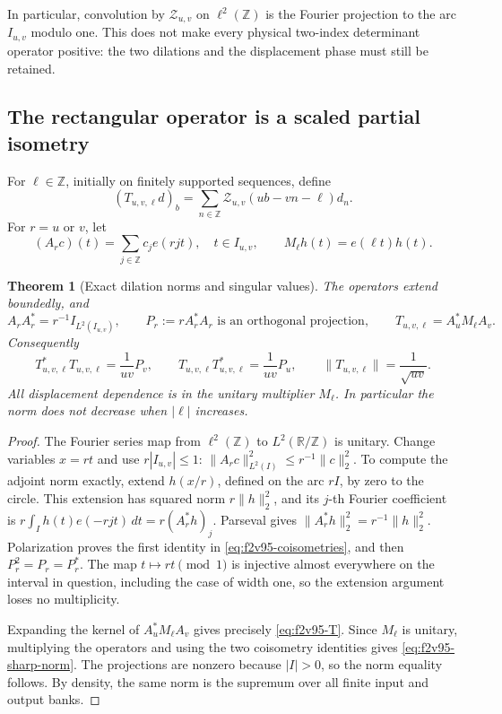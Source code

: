 \documentclass[11pt]{article}
\newtheorem{theorem}{Theorem}[section]
\theoremstyle{definition}
\theoremstyle{remark}
\begin{document}
In particular, convolution by \(\mathscr Z_{u,v}\) on
\(\ell^2(\mathbb Z)\) is the Fourier projection to the arc
\(I_{u,v}\) modulo one.  This does not make every physical
two-index determinant operator positive: the two dilations and the
displacement phase must still be retained.

\subsection{The rectangular operator is a scaled partial isometry}

For \(\ell\in\mathbb Z\), initially on finitely supported sequences,
define
\begin{equation}
 (T_{u,v,\ell}d)_b
 =\sum_{n\in\mathbb Z}\mathscr Z_{u,v}(ub-vn-\ell)d_n.
 \label{eq:f2v95-T}
\end{equation}
For \(r=u\) or \(v\), let
\[
 (A_rc)(t)=\sum_{j\in\mathbb Z}c_j e(rjt),\quad t\in I_{u,v},
 \qquad M_\ell h(t)=e(\ell t)h(t).
\]

\begin{theorem}[Exact dilation norms and singular values]
\label{thm:f2v95-partial-isometry}
The operators extend boundedly, and
\begin{equation}
 A_rA_r^*=r^{-1}I_{L^2(I_{u,v})},\qquad
 P_r:=rA_r^*A_r\text{ is an orthogonal projection},\qquad
 T_{u,v,\ell}=A_u^*M_\ell A_v.
 \label{eq:f2v95-coisometries}
\end{equation}
Consequently
\begin{equation}
 T_{u,v,\ell}^*T_{u,v,\ell}=\frac1{uv}P_v,\qquad
 T_{u,v,\ell}T_{u,v,\ell}^*=\frac1{uv}P_u,\qquad
 \|T_{u,v,\ell}\|=\frac1{\sqrt{uv}}.
 \label{eq:f2v95-sharp-norm}
\end{equation}
All displacement dependence is in the unitary multiplier \(M_\ell\).
In particular the norm does not decrease when \(|\ell|\) increases.
\end{theorem}

\begin{proof}
The Fourier series map from \(\ell^2(\mathbb Z)\) to
\(L^2(\mathbb R/\mathbb Z)\) is unitary.  Change variables
\(x=rt\) and use \(r|I_{u,v}|\le1\):
\(\|A_rc\|_{L^2(I)}^2\le r^{-1}\|c\|_2^2\).
To compute the adjoint norm exactly, extend \(h(x/r)\), defined
on the arc \(rI\), by zero to the circle.  This extension has squared
norm \(r\|h\|_2^2\), and its \(j\)-th Fourier coefficient is
\(r\int_I h(t)e(-rjt)\,dt=r(A_r^*h)_j\).
Parseval gives \(\|A_r^*h\|_2^2=r^{-1}\|h\|_2^2\).
Polarization proves the first identity in
\eqref{eq:f2v95-coisometries}, and then \(P_r^2=P_r=P_r^*\).
The map \(t\mapsto rt\pmod1\) is injective almost everywhere
on the interval in question, including the case of width one, so the
extension argument loses no multiplicity.

Expanding the kernel of \(A_u^*M_\ell A_v\) gives precisely
\eqref{eq:f2v95-T}.  Since \(M_\ell\) is unitary, multiplying
the operators and using the two coisometry identities gives
\eqref{eq:f2v95-sharp-norm}.  The projections are nonzero because
\(|I|>0\), so the norm equality follows.  By density, the same norm
is the supremum over all finite input and output banks.
\end{proof}
\end{document}
